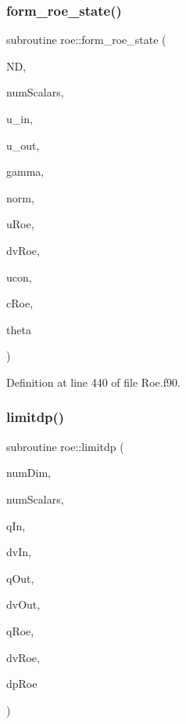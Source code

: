 \subsubsection{\texorpdfstring{form\+\_\+roe\+\_\+state()}{form\_roe\_state()}}
{\footnotesize\ttfamily subroutine roe\+::form\+\_\+roe\+\_\+state (\begin{DoxyParamCaption}\item[{integer(4), intent(in)}]{ND,  }\item[{integer(4), intent(in)}]{num\+Scalars,  }\item[{real(8), dimension(nd+2), intent(in)}]{u\+\_\+in,  }\item[{real(8), dimension(nd+2), intent(in)}]{u\+\_\+out,  }\item[{real(8), intent(in)}]{gamma,  }\item[{real(8), dimension(nd), intent(in)}]{norm,  }\item[{real(8), dimension(nd+2), intent(out)}]{u\+Roe,  }\item[{real(8), dimension(nd+3), intent(out)}]{dv\+Roe,  }\item[{real(8), intent(out)}]{ucon,  }\item[{real(8), intent(out)}]{c\+Roe,  }\item[{real(8), intent(out)}]{theta }\end{DoxyParamCaption})}



Definition at line 440 of file Roe.\+f90.

\hypertarget{namespaceroe_a2a5de1e6c84ae98f35621785e4c04770}{}\label{namespaceroe_a2a5de1e6c84ae98f35621785e4c04770} 
\subsubsection{\texorpdfstring{limitdp()}{limitdp()}}
{\footnotesize\ttfamily subroutine roe\+::limitdp (\begin{DoxyParamCaption}\item[{integer(4), intent(in)}]{num\+Dim,  }\item[{integer(4), intent(in)}]{num\+Scalars,  }\item[{real(8), dimension(numdim+2+numscalars), intent(in)}]{q\+In,  }\item[{real(8), dimension(numdim+2), intent(in)}]{dv\+In,  }\item[{real(8), dimension(numdim+2+numscalars), intent(in)}]{q\+Out,  }\item[{real(8), dimension(numdim+2), intent(in)}]{dv\+Out,  }\item[{real(8), dimension(numdim+2+numscalars), intent(in)}]{q\+Roe,  }\item[{real(8), dimension(numdim+2), intent(in)}]{dv\+Roe,  }\item[{real(8), dimension(numscalars+2), intent(inout)}]{dp\+Roe }\end{DoxyParamCaption})}



